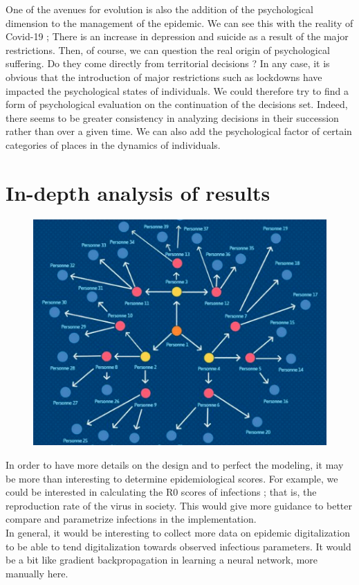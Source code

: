 One of the avenues for evolution is also the addition of the psychological dimension to the management of the epidemic. We can see this with the reality of Covid-19 ; There is an increase in depression and suicide as a result of the major restrictions. Then, of course, we can question the real origin of psychological suffering. Do they come directly from territorial decisions ? In any case, it is obvious that the introduction of major restrictions such as lockdowns have impacted the psychological states of individuals. We could therefore try to find a form of psychological evaluation on the continuation of the decisions set. Indeed, there seems to be greater consistency in analyzing decisions in their succession rather than over a given time. We can also add the psychological factor of certain categories of places in the dynamics of individuals.\\

\section{In-depth analysis of results}

\begin{figure}[h]
  \centering
  \includegraphics[width=0.8\linewidth]{Media/R0.png}
  \caption{}
  \label{fig:r0}
\end{figure}

In order to have more details on the design and to perfect the modeling, it may be more than interesting to determine epidemiological scores. For example, we could be interested in calculating the R0 scores of infections ; that is, the reproduction rate of the virus in society. This would give more guidance to better compare and parametrize infections in the implementation.\\

In general, it would be interesting to collect more data on epidemic digitalization to be able to tend digitalization towards observed infectious parameters. It would be a bit like gradient backpropagation in learning a neural network, more manually here.\\